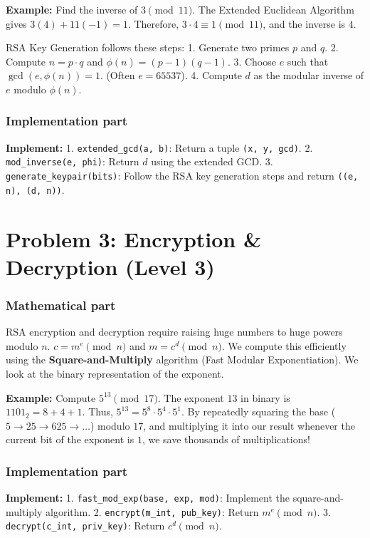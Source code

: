 \documentclass[11pt]{article}
\begin{document}
\textbf{Example:} Find the inverse of $3 \pmod{11}$. 
The Extended Euclidean Algorithm gives $3(4) + 11(-1) = 1$. 
Therefore, $3 \cdot 4 \equiv 1 \pmod{11}$, and the inverse is $4$.

RSA Key Generation follows these steps:
1. Generate two primes $p$ and $q$.
2. Compute $n = p \cdot q$ and $\phi(n) = (p-1)(q-1)$.
3. Choose $e$ such that $\gcd(e, \phi(n)) = 1$. (Often $e=65537$).
4. Compute $d$ as the modular inverse of $e$ modulo $\phi(n)$.

\subsubsection*{Implementation part}
\textbf{Implement:}
1. \lstinline|extended_gcd(a, b)|: Return a tuple \lstinline|(x, y, gcd)|.
2. \lstinline|mod_inverse(e, phi)|: Return $d$ using the extended GCD.
3. \lstinline|generate_keypair(bits)|: Follow the RSA key generation steps and return \lstinline|((e, n), (d, n))|.


\section*{Problem 3: Encryption \& Decryption (Level 3)}

\subsubsection*{Mathematical part}
RSA encryption and decryption require raising huge numbers to huge powers modulo $n$.
$c = m^e \pmod n$ and $m = c^d \pmod n$.
We compute this efficiently using the \textbf{Square-and-Multiply} algorithm (Fast Modular Exponentiation). We look at the binary representation of the exponent.

\textbf{Example:} Compute $5^{13} \pmod{17}$. 
The exponent $13$ in binary is $1101_2 = 8 + 4 + 1$.
Thus, $5^{13} = 5^8 \cdot 5^4 \cdot 5^1$. 
By repeatedly squaring the base ($5 \to 25 \to 625 \to \dots$) modulo $17$, and multiplying it into our result whenever the current bit of the exponent is $1$, we save thousands of multiplications!

\subsubsection*{Implementation part}
\textbf{Implement:}
1. \lstinline|fast_mod_exp(base, exp, mod)|: Implement the square-and-multiply algorithm.
2. \lstinline|encrypt(m_int, pub_key)|: Return $m^e \pmod n$.
3. \lstinline|decrypt(c_int, priv_key)|: Return $c^d \pmod n$.
\end{document}
